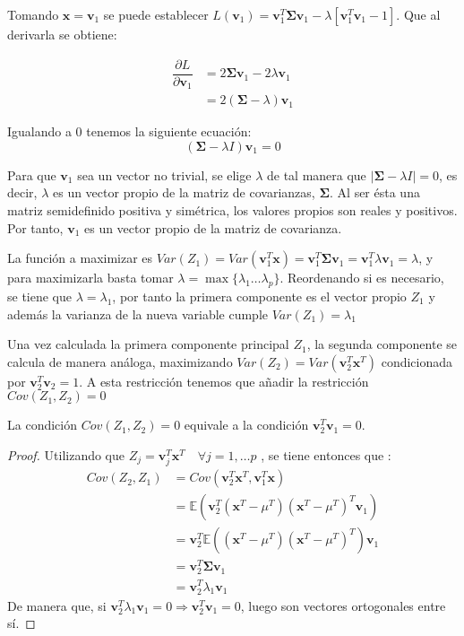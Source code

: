 \noindent Tomando $\textbf{x}=\textbf{v}_1$ se puede establecer $L(\textbf{v}_1)=\textbf{v}_1^T \mathbf{\Sigma} \textbf{v}_1 - \lambda[\textbf{v}_1^T \textbf{v}_1-1]$. Que al derivarla se obtiene:

\begin{align*}
\dfrac{\partial L}{\partial \textbf{v}_1} &= 2\mathbf{\Sigma} \textbf{v}_1 - 2\lambda\textbf{v}_1\\
& = 2(\mathbf{\Sigma}-\lambda)\textbf{v}_1 
\end{align*}

\noindent Igualando a 0 tenemos la siguiente ecuación: 
\begin{equation}
(\mathbf{\Sigma}-\lambda I)\textbf{v}_1=0
\end{equation}

\noindent Para que $\textbf{v}_1$ sea un vector no trivial, se elige $\lambda$ de tal manera que $|\mathbf{\Sigma}-\lambda I| = 0$, es decir, $\lambda$ es un vector propio de la matriz de covarianzas, $\mathbf{\Sigma}$. Al ser ésta una matriz semidefinido positiva y simétrica, los valores propios son reales y positivos. Por tanto, $\textbf{v}_1$ es un vector propio de la matriz de covarianza.

\noindent La función a maximizar es $Var(Z_1)=Var(\textbf{v}_1^T\textbf{x})=\textbf{v}_1^T\mathbf{\Sigma} \textbf{v}_1=\textbf{v}_1^T\lambda \textbf{v}_1=\lambda$, y para maximizarla basta tomar $\lambda=\max{\lbrace\lambda_1\ldots \lambda_p\rbrace}$. Reordenando si es necesario, se tiene que $\lambda=\lambda_1$, por tanto la primera componente es el vector propio $Z_1$ y además la varianza de la nueva variable cumple $Var(Z_1)=\lambda_1$ 

\noindent Una vez calculada la primera componente principal $Z_1$, la segunda componente se calcula de manera análoga, maximizando $Var(Z_2)=Var(\textbf{v}_2^T\textbf{x}^T)$ condicionada por $\textbf{v}_2^T\textbf{v}_2=1$. A esta restricción tenemos que añadir la restricción $Cov(Z_1,Z_2)=0 $

\begin{propo}
La condición $Cov(Z_1,Z_2)=0 $ equivale a la condición $\textbf{v}_2^T\textbf{v}_1 = 0$.
\begin{proof}
Utilizando que $Z_j=\textbf{v}_j^T \textbf{x}^T \quad \forall j=1,\ldots p$ , se tiene entonces que :
\begin{align*}
Cov(Z_2,Z_1)&= Cov (\textbf{v}_2^T\mathbf{x}^T,\mathbf{v}_1^T\mathbf{x})\\ 
&= \mathbb{E}(\mathbf{v}_2^T(\mathbf{x}^T-\mu^T)(\mathbf{x}^T-\mu^T)^T \mathbf{v}_1)\\
&= \textbf{v}_2^T \mathbb{E}((\textbf{x}^T-\mu^T)(\mathbf{x}^T-\mu^T)^T) \textbf{v}_1\\
&= \textbf{v}_2^T \mathbf{\Sigma} \textbf{v}_1 \\
&= \textbf{v}_2^T \lambda_1 \textbf{v}_1
\end{align*}
\noindent De manera que, si $\mathbf{v}_2^T \lambda_1 \mathbf{v}_1 = 0 \Rightarrow \mathbf{v}_2^T \mathbf{v}_1=0 $, luego son vectores ortogonales entre sí.
\end{proof}
\end{propo}


